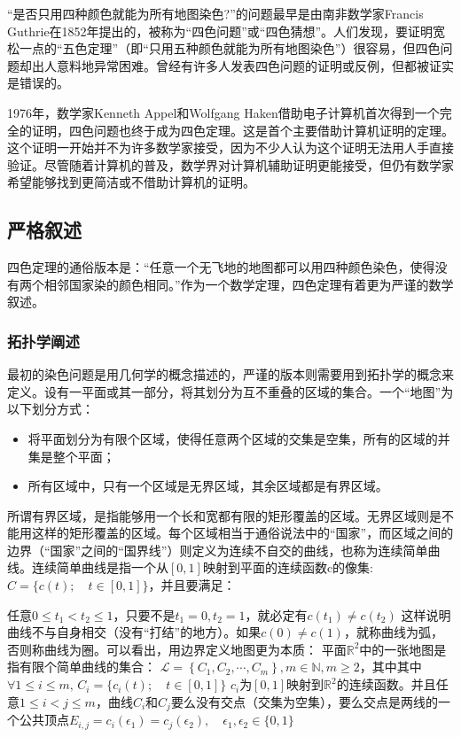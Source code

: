 \documentclass[12pt]{article} %
\begin{document}
“是否只用四种颜色就能为所有地图染色?”的问题最早是由南非数学家Francis Guthrie在1852年提出的，被称为“四色问题”或“四色猜想”。人们发现，要证明宽松一点的“五色定理”（即“只用五种颜色就能为所有地图染色”）很容易，但四色问题却出人意料地异常困难。曾经有许多人发表四色问题的证明或反例，但都被证实是错误的。

1976年，数学家Kenneth Appel和Wolfgang Haken借助电子计算机首次得到一个完全的证明，四色问题也终于成为四色定理。这是首个主要借助计算机证明的定理。这个证明一开始并不为许多数学家接受，因为不少人认为这个证明无法用人手直接验证。尽管随着计算机的普及，数学界对计算机辅助证明更能接受，但仍有数学家希望能够找到更简洁或不借助计算机的证明。
\subsection{严格叙述}
四色定理的通俗版本是：“任意一个无飞地的地图都可以用四种颜色染色，使得没有两个相邻国家染的颜色相同。”作为一个数学定理，四色定理有着更为严谨的数学叙述。

    \subsubsection{拓扑学阐述}
    
    最初的染色问题是用几何学的概念描述的，严谨的版本则需要用到拓扑学的概念来定义。设有一平面或其一部分，将其划分为互不重叠的区域的集合。一个“地图”为以下划分方式\cite{rudo}：
\begin{itemize}
\item 将平面划分为有限个区域，使得任意两个区域的交集是空集，所有的区域的并集是整个平面；
\item 所有区域中，只有一个区域是无界区域，其余区域都是有界区域。

\end{itemize}
所谓有界区域，是指能够用一个长和宽都有限的矩形覆盖的区域。无界区域则是不能用这样的矩形覆盖的区域\cite{rudo}。每个区域相当于通俗说法中的“国家”，而区域之间的边界（“国家”之间的“国界线”）则定义为连续不自交的曲线，也称为连续简单曲线。连续简单曲线是指一个从$[0, 1]$映射到平面的连续函数c的像集: $C=\{c(t);\quad t\in [0,1]\}$，并且要满足：

任意$0\leqslant t_{1}<t_{2}\leqslant 1$，只要不是$t_{1}=0,t_{2}=1$，就必定有$c(t_{1})\neq c(t_{2})$
这样说明曲线不与自身相交（没有“打结”的地方）。如果$c(0)\neq c(1)$，就称曲线为弧，否则称曲线为圈\cite{rudo}。可以看出，用边界定义地图更为本质：
平面$\mathbb {R} ^{2}$中的一张地图是指有限个简单曲线的集合：
$\mathcal{L}=\left\{C_{1}, C_{2}, \cdots, C_{m}\right\}, m \in \mathbb{N}, m \geqslant 2$，其中其中$\forall 1\leqslant i\leqslant m,\,C_{i}=\{c_{i}(t);\quad t\in [0,1]\}$
$c_i$为$[0, 1]$映射到$\mathbb {R} ^{2}$的连续函数。并且任意$1\leqslant i<j\leqslant m$，曲线$C_i$和$C_{j}$要么没有交点（交集为空集），要么交点是两线的一个公共顶点$E_{i, j}=c_{i}\left(\epsilon_{1}\right)=c_{j}\left(\epsilon_{2}\right), \quad \epsilon_{1}, \epsilon_{2} \in\{0,1\}$\cite{rudo}
\end{document}
